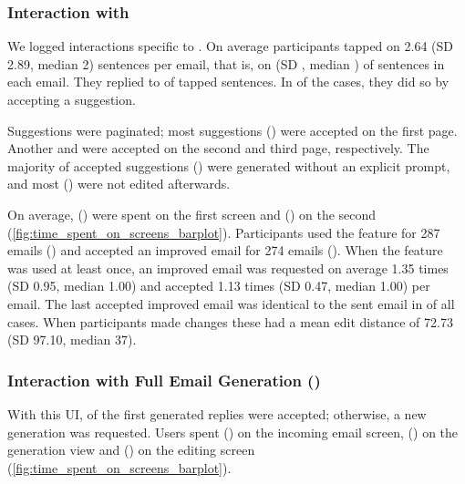 \subsubsection{Interaction with \modeours}
We logged interactions specific to \modeours.
On average participants tapped on 2.64  (SD 2.89, median 2) sentences per email, that is, on  (SD , median ) of sentences in each email.
They replied to  of tapped sentences. In  of the cases, they did so by accepting a suggestion. %

Suggestions were paginated; most suggestions () were accepted on the first page. Another  and  were accepted on the second and third page, respectively.
The majority of accepted suggestions () were generated without an explicit prompt, and most () were not edited afterwards.






On average,  () were spent on the first screen and  () on the second (\cref{fig:time_spent_on_screens_barplot}).
Participants used the \imppass{} feature for 287 emails () and accepted an improved email for 274 emails ().
When the \imppass{} feature was used at least once, an improved email was requested on average 1.35 times (SD 0.95, median 1.00) and accepted 1.13 times (SD 0.47, median 1.00) per email.
The last accepted improved email was identical to the sent email in  of all cases.
When participants made changes these had a mean edit distance of 72.73 (SD 97.10, median 37).


\subsubsection{Interaction with Full Email Generation (\modemail)}
With this UI,  of the first generated replies were accepted; otherwise, a new generation was requested.
Users spent  () on the incoming email screen,  () on the generation view and  () on the editing screen (\cref{fig:time_spent_on_screens_barplot}).

